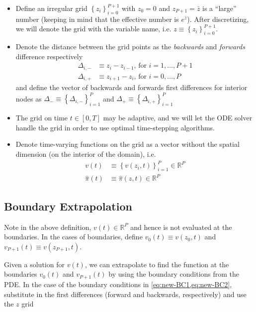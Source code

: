 \documentclass[11pt]{article}
\newcommand{\R}{\ensuremath{\mathbb{R}}}
\newcommand{\set}[1]{\ensuremath{\left\{{#1}\right\}}}
\begin{document}
\begin{itemize}
	\item Define an irregular  grid $\set{z_i}_{i=0}^{P+1}$ with $z_0 = 0$ and $z_{P+1} = \bar{z}$ is a ``large'' number (keeping in mind that the effective number is $e^{\bar{z}}$).  After discretizing, we will denote the grid with the variable name, i.e. $z \equiv \set{z_i}_{i=0}^{P+1}$.
	\item Denote the distance between the grid points as the \textit{backwards} and \textit{forwards} difference respectively
	\begin{align}
	\Delta_{i,-} &\equiv z_i - z_{i-1},\, \text{for } i = 1,\ldots, P+1\\
	\Delta_{i,+} &\equiv z_{i+1} - z_i,\, \text{for } i = 0,\ldots, P
	\end{align}\label{eq:Delta-plus}
	and define the vector of backwards and forwards first differences for interior nodes as $\Delta_{-} \equiv \set{\Delta_{i,-}}_{i=1}^P$ and $\Delta_{+} \equiv \set{\Delta_{i,+}}_{i=1}^P $

	\item The grid on time $t \in [0,T]$ may be adaptive, and we will let the ODE solver handle the grid in order to use optimal time-stepping algorithms.
	\item Denote time-varying functions on the grid as a vector without the spatial dimension (on the interior of the domain), i.e.
	\begin{align}
	v(t) &\equiv \set{v(z_i, t)}_{i=1}^P\in\R^P\\
	\hat{\pi}(t) &\equiv	\hat{\pi}(z,t) \in \R^P
	\end{align}
\end{itemize}

\subsection{Boundary Extrapolation}\label{sec:boundary-extrapolation}
Note in the above definition, $v(t) \in \R^P$ and hence is not evaluated at the boundaries.  In the cases of boundaries, define $v_0(t) \equiv v(z_0, t)$ and $v_{P+1}(t) \equiv v(z_{P+1},t)$.

Given a solution for $v(t)$, we can extrapolate to find the function at the boundaries $v_0(t)$ and $v_{P+1}(t)$ by using the boundary conditions from the PDE.  In the case of the boundary conditions in \cref{eq:new-BC1,eq:new-BC2}, substitute in the first differences (forward and backwards, respectively) and use the $z$ grid
\end{document}
